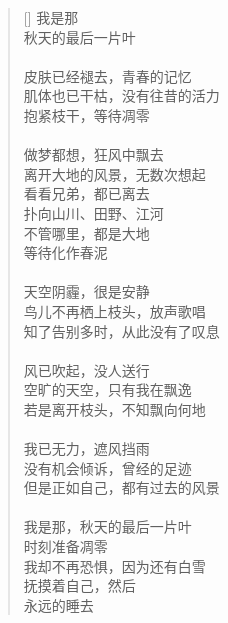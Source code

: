 \renewcommand{\poemtoc}{section}
\settowidth{\versewidth}{无所事事，等待凋零}
\begin{verse}[\versewidth]
我是那\\
秋天的最后一片叶\\
~\\
皮肤已经褪去，青春的记忆\\
肌体也已干枯，没有往昔的活力\\
抱紧枝干，等待凋零\\
~\\
做梦都想，狂风中飘去\\
离开大地的风景，无数次想起\\
看看兄弟，都已离去\\
扑向山川、田野、江河\\
不管哪里，都是大地\\
等待化作春泥\\
~\\
天空阴霾，很是安静\\
鸟儿不再栖上枝头，放声歌唱\\
知了告别多时，从此没有了叹息\\
~\\
风已吹起，没人送行\\
空旷的天空，只有我在飘逸\\
若是离开枝头，不知飘向何地\\
~\\
我已无力，遮风挡雨\\
没有机会倾诉，曾经的足迹\\
但是正如自己，都有过去的风景\\
~\\
我是那，秋天的最后一片叶\\
时刻准备凋零\\
我却不再恐惧，因为还有白雪\\
抚摸着自己，然后\\
永远的睡去
\end{verse}
